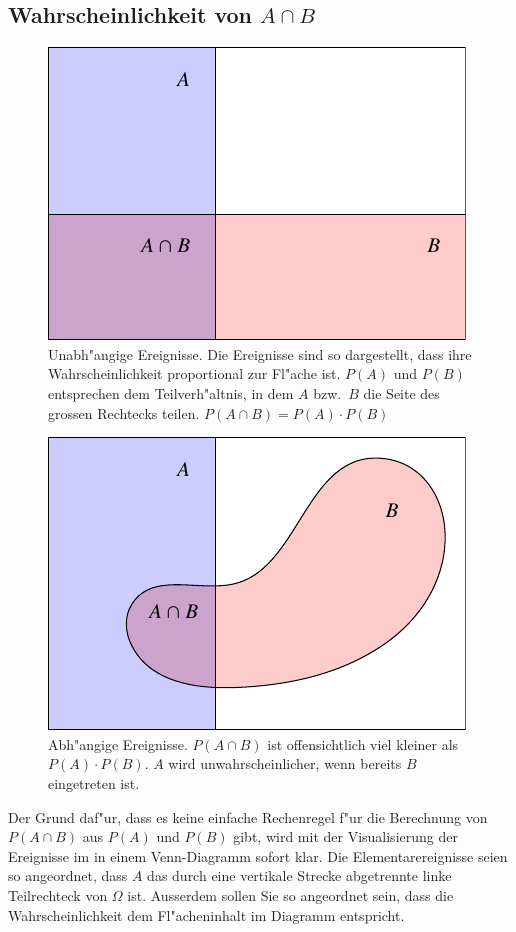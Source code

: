 \subsection{Wahrscheinlichkeit von \texorpdfstring{$A\cap B$}{A geschnitten B}}
\begin{figure}
\begin{center}
\includegraphics{images/abhaengigkeit-1}
\end{center}
\caption{Unabh"angige Ereignisse.
Die Ereignisse sind so dargestellt,
dass ihre Wahrscheinlichkeit proportional zur Fl"ache ist.
$P(A)$ und $P(B)$
entsprechen dem Teilverh"altnis, in dem $A$ bzw.~$B$ die Seite des grossen
Rechtecks teilen.
$P(A\cap B)=P(A)\cdot P(B)$\label{unabhaengig}}
\end{figure}
\begin{figure}
\begin{center}
\includegraphics{images/abhaengigkeit-2}
\end{center}
\caption{Abh"angige Ereignisse.
$P(A\cap B)$ ist offensichtlich viel kleiner
als $P(A)\cdot P(B)$.
$A$ wird unwahrscheinlicher, wenn bereits $B$ eingetreten
ist.
\label{abhaengig}}
\end{figure}
Der Grund daf"ur, dass es keine einfache Rechenregel f"ur die Berechnung von 
$P(A\cap B)$ aus $P(A)$ und $P(B)$ gibt, wird mit der
Visualisierung der Ereignisse im in einem Venn-Diagramm sofort klar.
Die Elementarereignisse seien so angeordnet, dass $A$ das durch eine
vertikale Strecke abgetrennte linke Teilrechteck von $\Omega$ ist.
Ausserdem
sollen Sie so angeordnet sein, dass die Wahrscheinlichkeit dem
Fl"acheninhalt im Diagramm entspricht.

